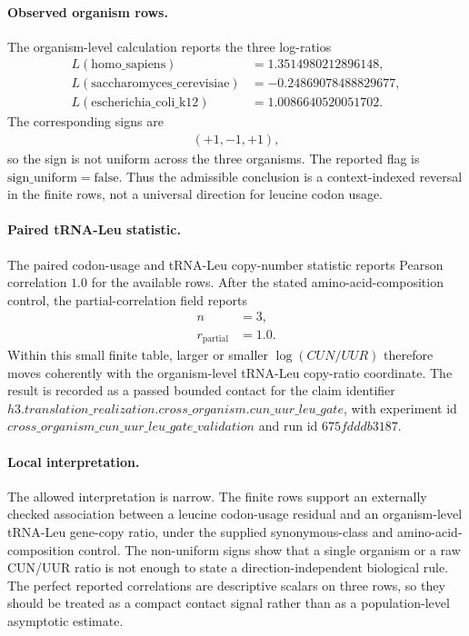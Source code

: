 \paragraph{Observed organism rows.}
The organism-level calculation reports the three log-ratios
$$
\begin{aligned}
  L(\mathrm{homo\_sapiens}) &= 1.3514980212896148,\\
  L(\mathrm{saccharomyces\_cerevisiae}) &= -0.24869078488829677,\\
  L(\mathrm{escherichia\_coli\_k12}) &= 1.0086640520051702.
\end{aligned}
$$
The corresponding signs are
$$
\begin{aligned}
  (+1,-1,+1),
\end{aligned}
$$
so the sign is not uniform across the three organisms.  The reported flag is $\mathrm{sign\_uniform}=\mathrm{false}$.  Thus the admissible conclusion is a context-indexed reversal in the finite rows, not a universal direction for leucine codon usage.

\paragraph{Paired tRNA-Leu statistic.}
The paired codon-usage and tRNA-Leu copy-number statistic reports Pearson correlation $1.0$ for the available rows.  After the stated amino-acid-composition control, the partial-correlation field reports
$$
\begin{aligned}
  n &= 3,\\
  r_{\mathrm{partial}} &= 1.0.
\end{aligned}
$$
Within this small finite table, larger or smaller $\log(CUN/UUR)$ therefore moves coherently with the organism-level tRNA-Leu copy-ratio coordinate.  The result is recorded as a passed bounded contact for the claim identifier $h3.translation\_realization.cross\_organism.cun\_uur\_leu\_gate$, with experiment id $cross\_organism\_cun\_uur\_leu\_gate\_validation$ and run id $675fdddb3187$.

\paragraph{Local interpretation.}
The allowed interpretation is narrow.  The finite rows support an externally checked association between a leucine codon-usage residual and an organism-level tRNA-Leu gene-copy ratio, under the supplied synonymous-class and amino-acid-composition control.  The non-uniform signs show that a single organism or a raw CUN/UUR ratio is not enough to state a direction-independent biological rule.  The perfect reported correlations are descriptive scalars on three rows, so they should be treated as a compact contact signal rather than as a population-level asymptotic estimate.

